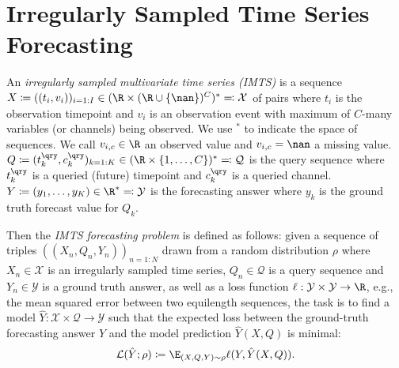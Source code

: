 
\section{Irregularly Sampled Time Series Forecasting}\label{sec:prob_form}
%
An \emph{irregularly sampled multivariate time series (IMTS)} is a
sequence
  $X \coloneqq ((t_i, v_i))_{i=1:I} \in (\R \times (\R\cup \{\nan\})^C)^* \eqqcolon \mathcal{X}$
of pairs where
  $t_i$ is the observation timepoint and
  $v_i$ is an observation event
    with maximum of $C$-many variables (or channels) being observed.
We use $^*$ to indicate the space of sequences.
We call
  $v_{i,c} \in\R$ an observed value and
  $v_{i,c} = \nan$ a missing value.
$Q\coloneqq (t^\qry_k, c^\qry_k)_{k=1:K} \in (\R\times \{1, \ldots, C\})^*\eqqcolon \mathcal{Q}$
is the query sequence where
  $t^\qry_k$ is a queried (future) timepoint and
  $c^\qry_k$ is a queried channel.
$Y \coloneqq (y_1, \ldots, y_K) \in \R^* \eqqcolon \mathcal{Y}$
is the forecasting answer where
  $y_k$ is the ground truth forecast value for $Q_k$.

Then the \emph{IMTS forecasting problem} is defined as
follows:
given a sequence of triples $((X_n, Q_n, Y_n))_{n=1:N}$
drawn from a random distribution $\rho$ where
  $X_n \in\mathcal{X}$ is an irregularly sampled time series,
  $Q_n\in\mathcal{Q}$ is a query sequence and
  $Y_n \in \mathcal{Y}$ is a ground truth answer,
as well as
a loss function
  $\ell: \mathcal{Y} \times \mathcal{Y}\to \R$,
    e.g., the mean squared error between two equilength sequences,
the task is to find a model
  $\hat{Y}: \mathcal{X}\times \mathcal{Q} \to\mathcal{Y}$
such that the expected loss between
  the ground-truth forecasting answer $Y$ and
  the model prediction $\hat{Y}(X, Q)$ is minimal:
\begin{align}
	\mathcal{L}(\hat{Y}; \rho) \coloneqq \E_{(X, Q, Y)\sim \rho}
	\ell(Y, \hat{Y}(X,Q)).
\end{align}
